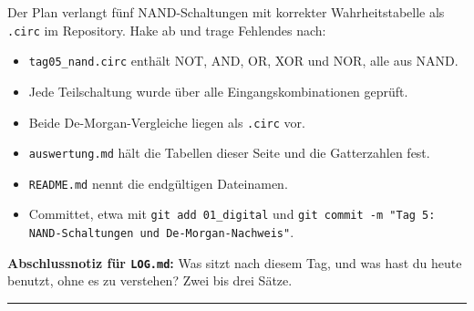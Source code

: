 \documentclass[10pt,a4paper]{article}
\newcommand{\block}[1]{\par\vspace{2mm}{\sffamily\large\bfseries #1}\par}
\newcommand{\code}[1]{\texttt{#1}}
\newcommand{\antwort}[1]{\par\vspace{#1}\hrule\vspace{3mm}}
\begin{document}
\block{10. Erfolgskontrolle des Tages}
Der Plan verlangt fünf NAND-Schaltungen mit korrekter Wahrheitstabelle als
\code{.circ} im Repository. Hake ab und trage Fehlendes nach:
\begin{itemize}[leftmargin=8mm,itemsep=1pt,topsep=2pt]
\item[$\square$] \code{tag05\_nand.circ} enthält NOT, AND, OR, XOR und NOR, alle aus NAND.
\item[$\square$] Jede Teilschaltung wurde über alle Eingangskombinationen geprüft.
\item[$\square$] Beide De-Morgan-Vergleiche liegen als \code{.circ} vor.
\item[$\square$] \code{auswertung.md} hält die Tabellen dieser Seite und die Gatterzahlen fest.
\item[$\square$] \code{README.md} nennt die endgültigen Dateinamen.
\item[$\square$] Committet, etwa mit \code{git add 01\_digital} und
      \code{git commit -m "Tag 5: NAND-Schaltungen und De-Morgan-Nachweis"}.
\end{itemize}

\textbf{Abschlussnotiz für \code{LOG.md}:} Was sitzt nach diesem Tag, und was
hast du heute benutzt, ohne es zu verstehen? Zwei bis drei Sätze.
\antwort{16mm}
\end{document}
